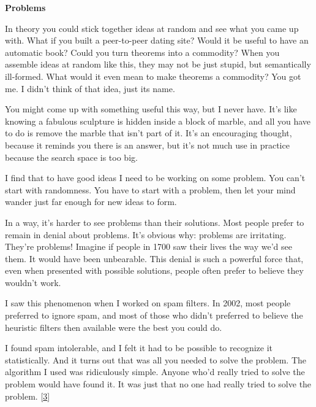 \textbf{Problems}

In theory you could stick together ideas at
                    random and see what you came up with. What if you built a
                    peer-to-peer dating site? Would it be useful to have an
                    automatic book? Could you turn theorems into a commodity?
                    When you assemble ideas at random like this, they may not be
                    just stupid, but semantically ill-formed. What would it even
                    mean to make theorems a commodity? You got me. I didn't
                    think of that idea, just its name.

You might come
                    up with something useful this way, but I never have. It's
                    like knowing a fabulous sculpture is hidden inside a block
                    of marble, and all you have to do is remove the marble that
                    isn't part of it. It's an encouraging thought, because it
                    reminds you there is an answer, but it's not much use in
                    practice because the search space is too big.

I
                    find that to have good ideas I need to be working on some
                    problem. You can't start with randomness. You have to start
                    with a problem, then let your mind wander just far enough
                    for new ideas to form.

In a way, it's harder to
                    see problems than their solutions. Most people prefer to
                    remain in denial about problems. It's obvious why: problems
                    are irritating. They're problems! Imagine if people in 1700
                    saw their lives the way we'd see them. It would have been
                    unbearable. This denial is such a powerful force that, even
                    when presented with possible solutions, people often prefer
                    to believe they wouldn't work.

I saw this
                    phenomenon when I worked on spam filters. In 2002, most
                    people preferred to ignore spam, and most of those who
                    didn't preferred to believe the heuristic filters then
                    available were the best you could do.

I found
                    spam intolerable, and I felt it had to be possible to
                    recognize it statistically. And it turns out that was all
                    you needed to solve the problem. The algorithm I used was
                    ridiculously simple. Anyone who'd really tried to solve the
                    problem would have found it. It was just that no one had
                    really tried to solve the problem.
                    [\href{\#f3n}{3}]

